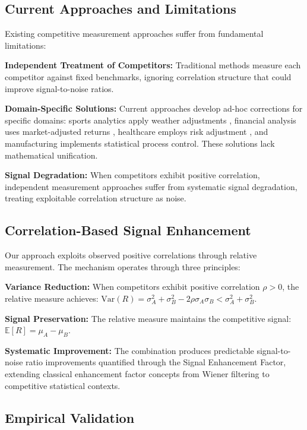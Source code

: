 \subsection{Current Approaches and Limitations}

Existing competitive measurement approaches suffer from fundamental limitations:

\textbf{Independent Treatment of Competitors:} Traditional methods measure each competitor against fixed benchmarks, ignoring correlation structure that could improve signal-to-noise ratios.

\textbf{Domain-Specific Solutions:} Current approaches develop ad-hoc corrections for specific domains: sports analytics apply weather adjustments \cite{forrest2000forecasting}, financial analysis uses market-adjusted returns \cite{sharpe1994sharpe}, healthcare employs risk adjustment \cite{hanushek2010generalizations}, and manufacturing implements statistical process control. These solutions lack mathematical unification.

\textbf{Signal Degradation:} When competitors exhibit positive correlation, independent measurement approaches suffer from systematic signal degradation, treating exploitable correlation structure as noise.

\subsection{Correlation-Based Signal Enhancement}

Our approach exploits observed positive correlations through relative measurement. The mechanism operates through three principles:

\textbf{Variance Reduction:} When competitors exhibit positive correlation $\rho > 0$, the relative measure achieves: $\text{Var}(R) = \sigma^2_A + \sigma^2_B - 2\rho\sigma_A\sigma_B < \sigma^2_A + \sigma^2_B$.

\textbf{Signal Preservation:} The relative measure maintains the competitive signal: $\mathbb{E}[R] = \mu_A - \mu_B$.

\textbf{Systematic Improvement:} The combination produces predictable signal-to-noise ratio improvements quantified through the Signal Enhancement Factor, extending classical enhancement factor concepts from Wiener filtering \cite{hardie2007fast} to competitive statistical contexts.

\subsection{Empirical Validation}

